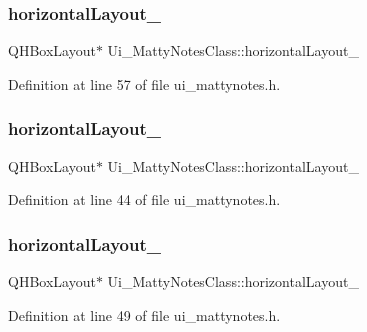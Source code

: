 \subsubsection{\texorpdfstring{horizontal\+Layout\+\_}{horizontalLayout\_10}}
{\footnotesize\ttfamily Q\+H\+Box\+Layout$\ast$ Ui\+\_\+\+Matty\+Notes\+Class\+::horizontal\+Layout\+\_}



Definition at line 57 of file ui\+\_\+mattynotes.\+h.

\hypertarget{classUi__MattyNotesClass_a5c081a5789ce4ce85b7e3cbdeccb3184}{}\label{classUi__MattyNotesClass_a5c081a5789ce4ce85b7e3cbdeccb3184} 
\subsubsection{\texorpdfstring{horizontal\+Layout\+\_}{horizontalLayout\_7}}
{\footnotesize\ttfamily Q\+H\+Box\+Layout$\ast$ Ui\+\_\+\+Matty\+Notes\+Class\+::horizontal\+Layout\+\_}



Definition at line 44 of file ui\+\_\+mattynotes.\+h.

\hypertarget{classUi__MattyNotesClass_a5cb2d28d113d4b473d55b47c7370582c}{}\label{classUi__MattyNotesClass_a5cb2d28d113d4b473d55b47c7370582c} 
\subsubsection{\texorpdfstring{horizontal\+Layout\+\_}{horizontalLayout\_9}}
{\footnotesize\ttfamily Q\+H\+Box\+Layout$\ast$ Ui\+\_\+\+Matty\+Notes\+Class\+::horizontal\+Layout\+\_}



Definition at line 49 of file ui\+\_\+mattynotes.\+h.

\hypertarget{classUi__MattyNotesClass_ac4b0de0a29ecefe9ab9355af44d9996a}{}\label{classUi__MattyNotesClass_ac4b0de0a29ecefe9ab9355af44d9996a} 
